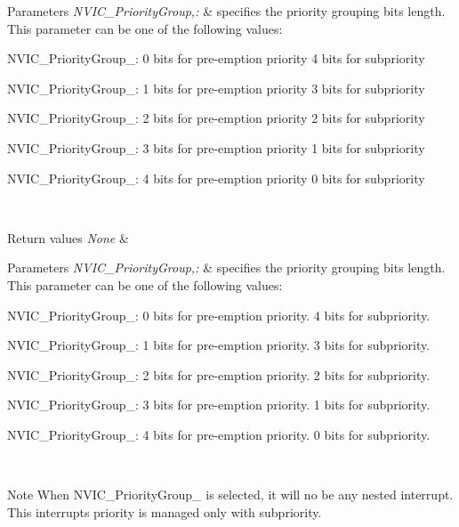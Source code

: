 \begin{DoxyParams}{Parameters}
{\em N\-V\-I\-C\-\_\-\-Priority\-Group,\-:} & specifies the priority grouping bits length. This parameter can be one of the following values\-: \begin{DoxyItemize}
\item N\-V\-I\-C\-\_\-\-Priority\-Group\-\_\-: 0 bits for pre-\/emption priority 4 bits for subpriority \item N\-V\-I\-C\-\_\-\-Priority\-Group\-\_\-: 1 bits for pre-\/emption priority 3 bits for subpriority \item N\-V\-I\-C\-\_\-\-Priority\-Group\-\_\-: 2 bits for pre-\/emption priority 2 bits for subpriority \item N\-V\-I\-C\-\_\-\-Priority\-Group\-\_\-: 3 bits for pre-\/emption priority 1 bits for subpriority \item N\-V\-I\-C\-\_\-\-Priority\-Group\-\_\-: 4 bits for pre-\/emption priority 0 bits for subpriority \end{DoxyItemize}
\\
\hline
\end{DoxyParams}

\begin{DoxyRetVals}{Return values}
{\em None} & \\
\hline
\end{DoxyRetVals}

\begin{DoxyParams}{Parameters}
{\em N\-V\-I\-C\-\_\-\-Priority\-Group,\-:} & specifies the priority grouping bits length. This parameter can be one of the following values\-: \begin{DoxyItemize}
\item N\-V\-I\-C\-\_\-\-Priority\-Group\-\_\-: 0 bits for pre-\/emption priority. 4 bits for subpriority. \item N\-V\-I\-C\-\_\-\-Priority\-Group\-\_\-: 1 bits for pre-\/emption priority. 3 bits for subpriority. \item N\-V\-I\-C\-\_\-\-Priority\-Group\-\_\-: 2 bits for pre-\/emption priority. 2 bits for subpriority. \item N\-V\-I\-C\-\_\-\-Priority\-Group\-\_\-: 3 bits for pre-\/emption priority. 1 bits for subpriority. \item N\-V\-I\-C\-\_\-\-Priority\-Group\-\_\-: 4 bits for pre-\/emption priority. 0 bits for subpriority. \end{DoxyItemize}
\\
\hline
\end{DoxyParams}
\begin{DoxyNote}{Note}
When N\-V\-I\-C\-\_\-\-Priority\-Group\-\_ is selected, it will no be any nested interrupt. This interrupts priority is managed only with subpriority. 
\end{DoxyNote}


